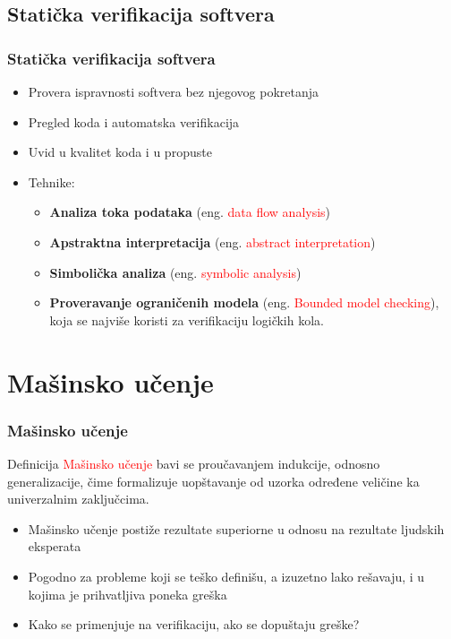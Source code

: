 \documentclass[11pt]{beamer}
\theoremstyle{definition}
\begin{document}
\subsection{Statička verifikacija softvera}
\label{subsec:staticka}

\begin{frame}
\frametitle{Statička verifikacija softvera}
\begin{itemize}
\item Provera ispravnosti softvera bez njegovog pokretanja
\item Pregled koda i automatska verifikacija
\item Uvid u kvalitet koda i u propuste
\item Tehnike:
	\begin{itemize}
		\item \textbf{Analiza toka podataka} (eng. \textcolor{red}{data flow analysis})
		\item \textbf{Apstraktna interpretacija} (eng. \textcolor{red}{abstract interpretation})
		\item \textbf{Simbolička analiza} (eng. \textcolor{red}{symbolic analysis})
		\item \textbf{Proveravanje ograničenih modela} (eng. \textcolor{red}{Bounded model checking}), koja se najviše koristi za verifikaciju logičkih kola.
	\end{itemize}
\end{itemize}
\end{frame}

\section{Mašinsko učenje}

\begin{frame}
\frametitle{Mašinsko učenje}

\begin{block}{Definicija}
\textcolor{red}{Mašinsko učenje} bavi se proučavanjem indukcije, odnosno generalizacije, čime formalizuje uopštavanje od uzorka određene veličine ka univerzalnim zaključcima.
\end{block}

\begin{itemize}
\item Mašinsko učenje postiže rezultate superiorne u odnosu na rezultate ljudskih eksperata
\item Pogodno za probleme koji se teško definišu, a izuzetno lako rešavaju, i u kojima je prihvatljiva poneka greška
\item Kako se primenjuje na verifikaciju, ako se dopuštaju greške?
\end{itemize}

\end{frame}
\end{document}

